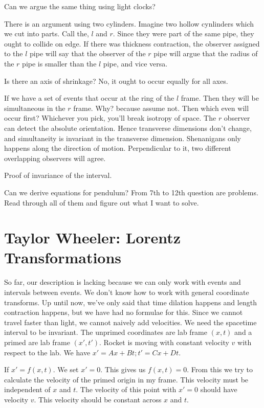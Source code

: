 \documentclass[11pt]{book}
\begin{document}
Can we argue the same thing using light clocks?

There is an argument using two cylinders. Imagine two hollow cynlinders which
we cut into parts. Call the, $l$ and $r$. Since they were part of the same
pipe, they ought to collide on edge. If there was thickness contraction, the
observer assigned to the $l$ pipe will say that the observer of the $r$ pipe
will argue that the radius of the $r$ pipe is smaller than the $l$ pipe,
and vice versa.

Is there an axis of shrinkage? No, it ought to occur equally for all axes.

If we have a set of events that occur at the ring of the $l$ frame. Then they
will be simultaneous in the $r$ frame. Why? because assume not. Then which
even will occur first? Whichever you pick, you'll break isotropy of space.
The $r$ observer can detect the absolute orientation. Hence transverse
dimensions don't change, and simultaneity is invariant in the transverse
dimension. Shenanigans only happens along the direction of motion. Perpendicular
to it, two different overlapping observers will agree.


Proof of invariance of the interval.

Can we derive equations for pendulum? From 7th to 12th question are problems.
Read through all of them and figure out what I want to solve.

\chapter{Taylor Wheeler: Lorentz Transformations}

So far, our description is lacking because we can only work with events
and intervals between events. We don't know how to work with general
coordinate transforms. Up until now, we've only said that time dilation
happens and length contraction happens, but we have had no formulae for this.
Since we cannot travel faster than light, we cannot naively add velocities.
We need the spacetime interval to be invariant. The unprimed coordinates are
lab frame $(x, t)$ and a  primed are lab frame $(x', t')$.
Rocket is moving with constant velocity $v$ with respect to the lab. We have
$x' = Ax + Bt; t' = Cx + Dt$.

If $x' = f(x, t)$. We set $x' = 0$. This gives us $f(x, t) = 0$. From this
we try to calculate the velocity of the primed origin in my frame. This velocity
must be independent of $x$ and $t$. The velocity of this point with $x' = 0$
should have velocity $v$. This velocity should be constant across $x$ and $t$.
\end{document}
